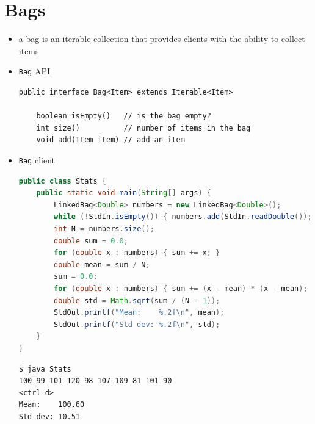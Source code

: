 \documentclass[8pt,a4paper,compress]{beamer}
\begin{document}
\section{Bags}
\begin{frame}[fragile]
\begin{itemize}
\item a bag is an iterable collection that provides clients with the ability to collect items

\item \lstinline{Bag} API
\begin{lstlisting}[language={}]
public interface Bag<Item> extends Iterable<Item> 

    boolean isEmpty()   // is the bag empty?
    int size()          // number of items in the bag
    void add(Item item) // add an item
\end{lstlisting}

\item \lstinline{Bag} client
\begin{lstlisting}[language=Java]
public class Stats {
    public static void main(String[] args) {
        LinkedBag<Double> numbers = new LinkedBag<Double>();
        while (!StdIn.isEmpty()) { numbers.add(StdIn.readDouble()); }
        int N = numbers.size();
        double sum = 0.0;
        for (double x : numbers) { sum += x; }
        double mean = sum / N;
        sum = 0.0;
        for (double x : numbers) { sum += (x - mean) * (x - mean); }
        double std = Math.sqrt(sum / (N - 1));
        StdOut.printf("Mean:    %.2f\n", mean);
        StdOut.printf("Std dev: %.2f\n", std);
    }
}
\end{lstlisting}

\begin{lstlisting}[language={}]
$ java Stats
100 99 101 120 98 107 109 81 101 90
<ctrl-d>
Mean:    100.60
Std dev: 10.51
\end{lstlisting}
\end{itemize}
\end{frame}
\end{document}
